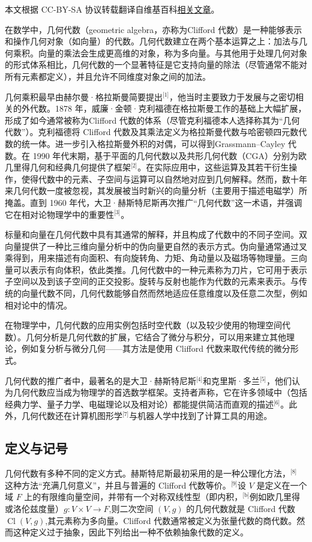 
本文根据 CC-BY-SA 协议转载翻译自维基百科\href{https://en.wikipedia.org/wiki/Geometric_algebra}{相关文章}。

在数学中，几何代数（geometric algebra，亦称为Clifford 代数）是一种能够表示和操作几何对象（如向量）的代数。几何代数建立在两个基本运算之上：加法与几何乘积。向量的乘法会生成更高维的对象，称为多向量。与其他用于处理几何对象的形式体系相比，几何代数的一个显著特征是它支持向量的除法（尽管通常不能对所有元素都定义），并且允许不同维度对象之间的加法。

几何乘积最早由赫尔曼·格拉斯曼简要提出\(^\text{[1]}\)，他当时主要致力于发展与之密切相关的外代数。1878 年，威廉·金顿·克利福德在格拉斯曼工作的基础上大幅扩展，形成了如今通常被称为Clifford 代数的体系（尽管克利福德本人选择称其为“几何代数”）。克利福德将 Clifford 代数及其乘法定义为格拉斯曼代数与哈密顿四元数代数的统一体。进一步引入格拉斯曼外积的对偶，可以得到Grassmann–Cayley 代数。在 1990 年代末期，基于平面的几何代数以及共形几何代数（CGA）分别为欧几里得几何和经典几何提供了框架\(^\text{[2]}\)。在实际应用中，这些运算及其若干衍生操作，使得代数中的元素、子空间与运算可以自然地对应到几何解释。然而，数十年来几何代数一度被忽视，其发展被当时新兴的向量分析（主要用于描述电磁学）所掩盖。直到 1960 年代，大卫·赫斯特尼斯再次推广“几何代数”这一术语，并强调它在相对论物理学中的重要性\(^\text{[3]}\)。

标量和向量在几何代数中具有其通常的解释，并且构成了代数中的不同子空间。双向量提供了一种比三维向量分析中的伪向量更自然的表示方式。伪向量通常通过叉乘得到，用来描述有向面积、有向旋转角、力矩、角动量以及磁场等物理量。三向量可以表示有向体积，依此类推。几何代数中的一种元素称为刀片，它可用于表示子空间以及到该子空间的正交投影。旋转与反射也能作为代数的元素来表示。与传统的向量代数不同，几何代数能够自然而然地适应任意维度以及任意二次型，例如相对论中的情况。

在物理学中，几何代数的应用实例包括时空代数（以及较少使用的物理空间代数）。几何分析是几何代数的扩展，它结合了微分与积分，可以用来建立其他理论，例如复分析与微分几何——其方法是使用 Clifford 代数来取代传统的微分形式。

几何代数的推广者中，最著名的是大卫·赫斯特尼斯\(^\text{[4]}\)和克里斯·多兰\(^\text{[5]}\)，他们认为几何代数应当成为物理学的首选数学框架。支持者声称，它在许多领域中（包括经典力学、量子力学、电磁理论以及相对论）都能提供简洁而直观的描述\(^\text{[6]}\)。此外，几何代数还在计算机图形学\(^\text{[7]}\)与机器人学中找到了计算工具的用途。
\subsection{定义与记号}
几何代数有多种不同的定义方式。赫斯特尼斯最初采用的是一种公理化方法，\(^\text{[8]}\) 这种方法“充满几何意义”，并且与普遍的 Clifford 代数等价。\(^\text{[9]}\)设 $V$ 是定义在一个域 $F$ 上的有限维向量空间，并带有一个对称双线性型（即内积，\(^\text{[b]}\)例如欧几里得或洛伦兹度量）$g : V \times V \to F $,则二次空间 $(V, g)$ 的几何代数就是 Clifford 代数$\operatorname{Cl}(V, g)$,其元素称为多向量。Clifford 代数通常被定义为张量代数的商代数。然而这种定义过于抽象，因此下列给出一种不依赖抽象代数的定义。

